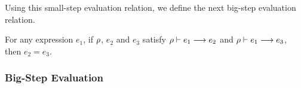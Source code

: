 {}


\infrule[E-IfTrue]
{}
{}

\infrule[E-IfFalse]
{}
{}

{}

{}

\infrule[E-LetValue]
{}
{}


\infrule[E-LetRec]
{}
{}


\infrule[E-Abs]
{}
{}

Using this small-step evaluation relation, we define the next big-step evaluation relation.

\begin{note}
    For any expression $e_1$, if $\rho$, $e_2$ and $e_3$ satisfy $\rho \vdash e_1 \longrightarrow e_2$ and $\rho \vdash e_1 \longrightarrow e_3$, then $e_2 = e_3$.
\end{note}

\subsubsection{Big-Step Evaluation}
